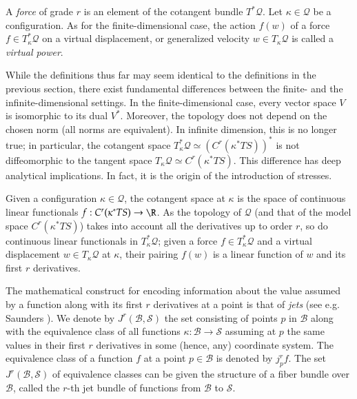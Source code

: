 \documentclass[smallextended]{svjour3}
\begin{document}
A \emph{force} of grade $r$ is an element of the cotangent bundle $T^*{\mathcal{Q}}$.
Let $\kappa\in{\mathcal{Q}}$ be a configuration.  As for the finite-dimensional case, the action $f(w)$ of a force $f\in T_\kappa^*{\mathcal{Q}}$ on a virtual displacement, or generalized velocity $w\in T_\kappa{\mathcal{Q}}$ is called a \emph{virtual power}.

While the definitions thus far may seem identical to the definitions in the previous section, there exist fundamental differences between the finite- and the infinite-dimensional settings. In the finite-dimensional case, every vector space $V$ is isomorphic to its dual $V^*$. Moreover, the topology does not depend on the chosen norm (all norms are equivalent). In infinite dimension, this is no longer true; in particular, the cotangent space $T^*_\kappa{\mathcal{Q}}\simeq (C^r(\kappa^*TS))^*$ is not diffeomorphic to the tangent space $T_\kappa{\mathcal{Q}}\simeq C^r(\kappa^*TS)$. This difference has deep analytical implications. In fact, it is the origin of the introduction of stresses.

Given a configuration $\kappa\in{\mathcal{Q}}$, the cotangent space at $\kappa$ is the space of continuous linear functionals $f:C^r({\kappa^*TS})\to\R$. As the topology of ${\mathcal{Q}}$ (and that of the model space $C^r({\kappa^*TS})$) takes into account all the derivatives up to order $r$, so do continuous linear functionals in $T_\kappa^*{\mathcal{Q}}$; given a force $f\in T_\kappa^*{\mathcal{Q}}$ and a virtual displacement $w\in T_\kappa{\mathcal{Q}}$ at $\kappa$, their pairing $f(w)$ is a linear function of $w$ and its first $r$ derivatives. 

The mathematical construct for encoding information about the value assumed by a function along with its first $r$ derivatives at a point is that of \emph{jets} (see e.g. Saunders \cite{Sau89}). We denote by $J^r({\mathcal{B}},{\mathcal{S}})$ the set consisting of points $p$ in ${\mathcal{B}}$ along with the equivalence class of all functions $\kappa:{\mathcal{B}}\to{\mathcal{S}}$ assuming at $p$ the same values in their first $r$ derivatives in some (hence, any) coordinate system. The equivalence class of a function $f$ at a point $p\in{\mathcal{B}}$ is denoted by $j^r_pf$.  The set $J^r({\mathcal{B}},{\mathcal{S}})$ of equivalence classes can be given the structure of a fiber bundle over ${\mathcal{B}}$, called the $r$-th jet bundle of functions from ${\mathcal{B}}$ to ${\mathcal{S}}$.
\end{document}
